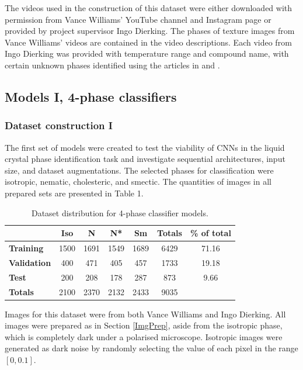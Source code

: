 \documentclass[12pt]{article}
\begin{document}
The videos used in the construction of this dataset were either downloaded with permission from Vance Williams' YouTube channel and Instagram page \cite{Williams20a, Williams20b} or provided by project supervisor Ingo Dierking. The phases of texture images from Vance Williams' videos are contained in the video descriptions. Each video from Ingo Dierking was provided with temperature range and compound name, with certain unknown phases identified using the articles in \cite{Schacht95} and \cite{Dierking94}.
\subsection{Models I, 4-phase classifiers}
\label{Mods1}
\subsubsection{Dataset construction I}
The first set of models were created to test the viability of CNNs in the liquid crystal phase identification task and investigate sequential architectures, input size, and dataset augmentations. The selected phases for classification were isotropic, nematic, cholesteric, and smectic. The quantities of images in all prepared sets are presented in Table 1.
\begin{table}[!htb]
\begin{center}
\caption{Dataset distribution for 4-phase classifier models.}
\begin{tabular}{l|c|c|c|c|c|c}
\toprule
& \textbf{Iso} & \textbf{N} & \textbf{N*} & \textbf{Sm} & \textbf{Totals} & \textbf{\% of total}\\
\midrule
\textbf{Training} & 1500 & 1691 & 1549 & 1689 & 6429 & 71.16\\
\textbf{Validation} & 400 & 471 & 405 & 457 & 1733 & 19.18\\
\textbf{Test} & 200 & 208 & 178 & 287 & 873 & 9.66\\
\midrule
\textbf{Totals} & 2100 & 2370 & 2132 & 2433 & 9035\\
\bottomrule
\end{tabular}
\end{center}
\end{table}
Images for this dataset were from both Vance Williams and Ingo Dierking. All images were prepared as in Section \ref{ImgPrep}, aside from the isotropic phase, which is completely dark under a polarised microscope. Isotropic images were generated as dark noise by randomly selecting the value of each pixel in the range $[0,0.1]$. 
\end{document}
